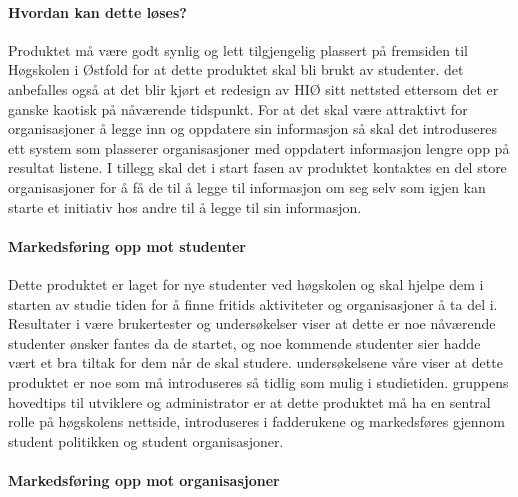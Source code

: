 \paragraph{Hvordan kan dette løses?}

Produktet må være godt synlig og lett tilgjengelig plassert på fremsiden til Høgskolen i Østfold for at dette produktet skal bli brukt av studenter. det anbefalles også at det blir kjørt et redesign av HIØ sitt nettsted ettersom det er ganske kaotisk på nåværende tidspunkt. For at det skal være attraktivt for organisasjoner å legge inn og oppdatere sin informasjon så skal det introduseres ett system som plasserer organisasjoner med oppdatert informasjon lengre opp på resultat listene. I tillegg skal det i start fasen av produktet kontaktes en del store organisasjoner for å få de til å legge til informasjon om seg selv som igjen kan starte et initiativ hos andre til å legge til sin informasjon. 


\paragraph{Markedsføring opp mot studenter}

Dette produktet er laget for nye studenter ved høgskolen og skal hjelpe dem i starten av studie tiden for å finne fritids aktiviteter og organisasjoner å ta del i. Resultater i være brukertester og undersøkelser viser at dette er noe nåværende studenter ønsker fantes da de startet, og noe kommende studenter sier hadde vært et bra tiltak for dem når de skal studere. 
undersøkelsene våre viser at dette produktet er noe som må introduseres så tidlig som mulig i studietiden. gruppens hovedtips til utviklere og administrator er at dette produktet må ha en sentral rolle på høgskolens nettside, introduseres i fadderukene og markedsføres gjennom student politikken og student organisasjoner.

\paragraph{Markedsføring opp mot organisasjoner}

